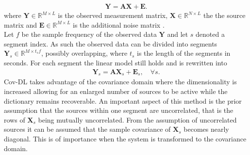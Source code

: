 \begin{align*}
\mathbf{Y} = \mathbf{AX}+\textbf{E}.
\end{align*}
where $\mathbf{Y} \in \mathbb{R}^{M \times L}$ is the observed  measurement matrix, $\mathbf{X} \in \mathbb{R}^{N \times L}$ the the source matrix and $\mathbf{E} \in \mathbb{R}^{M \times L}$ is the additional noise matrix .
\\
Let $f$ be the sample frequency of the observed data $\mathbf{Y}$ and let $s$ denoted a segment index. As such the observed data can be divided into segments $\mathbf{Y}_s \in \mathbb{R}^{M \times t_s f}$, possibly overlapping, where $t_s$ is the length of the segments in seconds. For each segment the linear model still holds and is rewritten into
\begin{align*}
\mathbf{Y}_s = \mathbf{AX}_s + \textbf{E}_s, \quad \forall s.
\end{align*}
Cov-DL takes advantage of the covariance domain where the dimensionality is increased allowing for an enlarged number of sources to be active while the dictionary remains recoverable.  
An important aspect of this method is the prior assumption that the sources within one segment are uncorrelated, that is the rows of $\textbf{X}_s$ being mutually uncorrelated. 
From the assumption of uncorrelated sources it can be assumed that the sample covariance of $\textbf{X}_s$ becomes nearly diagonal. This is of importance when the system is transformed to the covariance domain.    

